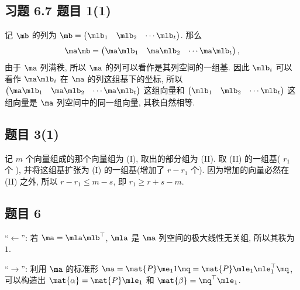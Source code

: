\subsection*{ 习题 6.7 题目 1(1) }
\begin{solution}
记 $\mb$ 的列为 $\mb = \begin{pmatrix} \mlb_1 & \mlb_2 & \cdots \mlb_t \end{pmatrix}$. 那么
\[
\ma \mb = \begin{pmatrix} \ma \mlb_1 & \ma \mlb_2 & \cdots \ma \mlb_t \end{pmatrix},
\]
由于 $\ma$ 列满秩, 所以 $\ma$ 的列可以看作是其列空间的一组基. 因此 $\mlb_i$ 可以看作 $\ma \mlb_i$ 在 $\ma$ 的列这组基下的坐标, 所以 $\begin{pmatrix} \ma \mlb_1 & \ma \mlb_2 & \cdots \ma \mlb_t \end{pmatrix}$ 这组向量和 $\begin{pmatrix} \mlb_1 & \mlb_2 & \cdots \mlb_t \end{pmatrix}$ 这组向量是 $\ma$ 列空间中的同一组向量, 其秩自然相等.
\end{solution}

\subsection*{ 题目 3(1) }
\begin{solution}
记 $m$ 个向量组成的那个向量组为 (I), 取出的部分组为 (I\!I). 取 (I\!I) 的一组基( $r_1$ 个 ), 并将这组基扩张为 (I) 的一组基(增加了 $r - r_1$ 个). 因为增加的向量必然在 (I\!I) 之外, 所以 $r - r_1 \leqslant m - s$, 即 $r_1 \geqslant r + s - m$.
\end{solution}

\subsection*{ 题目 6 }
\begin{solution}
``$\leftarrow$'': 若 $\ma = \mla \mlb^{\top}$, $\mla$ 是 $\ma$ 列空间的极大线性无关组, 所以其秩为 $1$.

``$\rightarrow$'': 利用 $\ma$ 的标准形 $\ma = \mat{P} \me_11 \mq = \mat{P} \mle_1 \mle_1^{\top} \mq$, 可以构造出 $\mat{\alpha} = \mat{P} \mle_1$ 和 $\mat{\beta} = \mq^{\top} \mle_1$. 
\end{solution}

